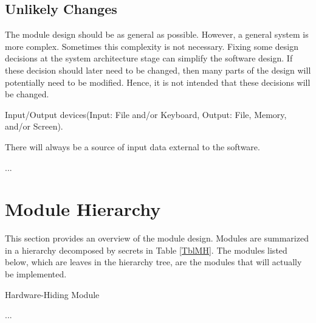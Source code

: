 \documentclass[12pt, titlepage]{article}
\newcommand{\newSection}[1]{
  \newpage
  \section{#1}
}
\newcounter{ucnum}
\newcommand{\uctheucnum}{UC\theucnum}
\newcounter{mnum}
\newcommand{\mthemnum}{M\themnum}
\begin{document}
	\subsection{Unlikely Changes} \label{SecUchange}

		The module design should be as general as possible. However, a general system is more complex. Sometimes this complexity is not necessary. Fixing some design decisions at the system architecture stage can simplify the software design. If these decision should later need to be changed, then many parts of the design	will potentially need to be modified. Hence, it is not intended that these decisions will be changed.

		\bigskip\begin{description}
			\item[ \uctheucnum \label{ucIO}:] Input/Output devices(Input: File and/or Keyboard, Output: File, Memory, and/or Screen).
			\item[ \uctheucnum \label{ucInput}:] There will always be a source of input data external to the software.
			\item ...
		\end{description}

\newSection{Module Hierarchy} \label{SecMH}

	This section provides an overview of the module design. Modules are summarized in a hierarchy decomposed by secrets in Table \ref{TblMH}. The modules listed below, which are leaves in the hierarchy tree, are the modules that will actually be implemented.

	\bigskip\begin{description}
	\item [ \mthemnum \label{mHH}:] Hardware-Hiding Module
	\item ...
	\end{description}
\end{document}
